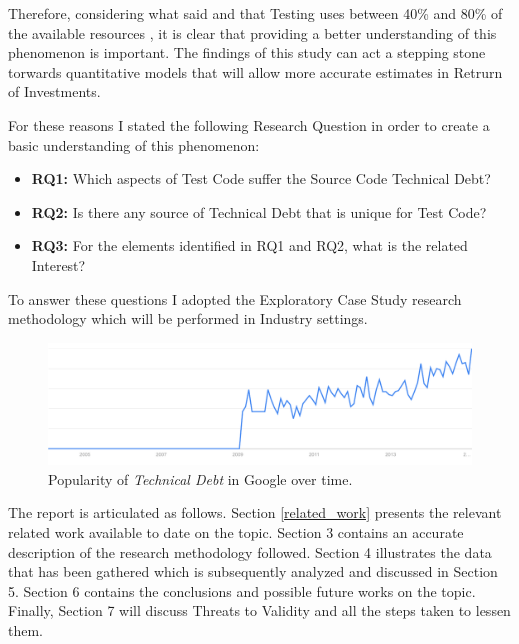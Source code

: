 Therefore, considering what said and that Testing uses between 40\% and 80\% of the available resources \cite{exploratorying_testing_td}, it is clear that providing a better understanding of this phenomenon is important. The findings of this study can act a stepping stone torwards quantitative models that will allow more accurate estimates in Retrurn of Investments.

For these reasons I stated the following Research Question in order to create a basic understanding of this phenomenon:
\begin{itemize}
    \item \textbf{RQ1:} Which aspects of Test Code suffer the Source Code Technical Debt?
    \item \textbf{RQ2:} Is there any source of Technical Debt that is unique for Test Code?
    \item \textbf{RQ3:} For the elements identified in RQ1 and RQ2, what is the related Interest?
\end{itemize}
To answer these questions I adopted the Exploratory Case Study research methodology which will be performed in Industry settings.

\begin{figure}[h]
    \centering
    \includegraphics[width=\textwidth]{figure/technicalDebt.pdf}
    \caption{Popularity of \textit{Technical Debt} in Google over time.}
    \label{fig:technical_debt_trend}
\end{figure}

The report is articulated as follows. Section \ref{related_work} presents the relevant related work available to date on the topic. Section 3 contains an accurate description of the research methodology followed. Section 4 illustrates the data that has been gathered which is subsequently analyzed and discussed in Section 5. Section 6 contains the conclusions and possible future works on the topic. Finally, Section 7 will discuss Threats to Validity and all the steps taken to lessen them.
